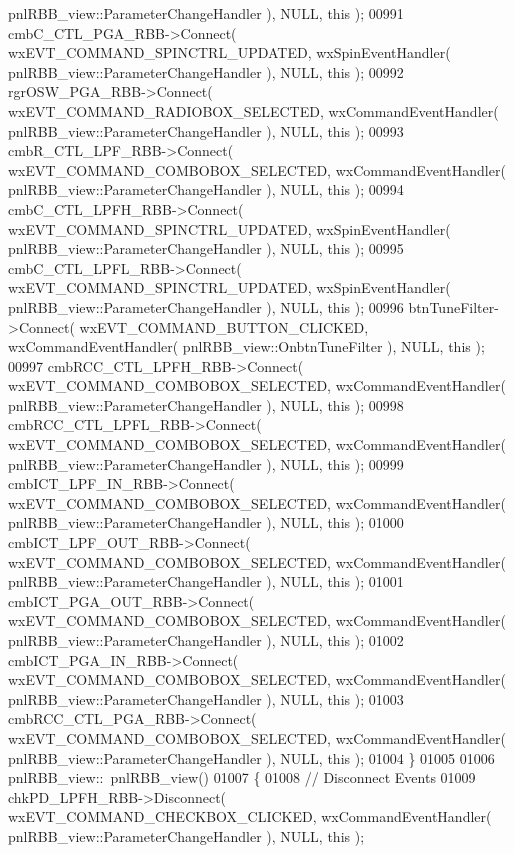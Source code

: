 \begin{DoxyCode}
      pnlRBB_view::ParameterChangeHandler ), NULL, \textcolor{keyword}{this} );
00991     cmbC_CTL_PGA_RBB->Connect( wxEVT\_COMMAND\_SPINCTRL\_UPDATED, wxSpinEventHandler( 
      pnlRBB_view::ParameterChangeHandler ), NULL, \textcolor{keyword}{this} );
00992     rgrOSW_PGA_RBB->Connect( wxEVT\_COMMAND\_RADIOBOX\_SELECTED, wxCommandEventHandler( 
      pnlRBB_view::ParameterChangeHandler ), NULL, \textcolor{keyword}{this} );
00993     cmbR_CTL_LPF_RBB->Connect( wxEVT\_COMMAND\_COMBOBOX\_SELECTED, wxCommandEventHandler( 
      pnlRBB_view::ParameterChangeHandler ), NULL, \textcolor{keyword}{this} );
00994     cmbC_CTL_LPFH_RBB->Connect( wxEVT\_COMMAND\_SPINCTRL\_UPDATED, wxSpinEventHandler( 
      pnlRBB_view::ParameterChangeHandler ), NULL, \textcolor{keyword}{this} );
00995     cmbC_CTL_LPFL_RBB->Connect( wxEVT\_COMMAND\_SPINCTRL\_UPDATED, wxSpinEventHandler( 
      pnlRBB_view::ParameterChangeHandler ), NULL, \textcolor{keyword}{this} );
00996     btnTuneFilter->Connect( wxEVT\_COMMAND\_BUTTON\_CLICKED, wxCommandEventHandler( 
      pnlRBB_view::OnbtnTuneFilter ), NULL, \textcolor{keyword}{this} );
00997     cmbRCC_CTL_LPFH_RBB->Connect( wxEVT\_COMMAND\_COMBOBOX\_SELECTED, wxCommandEventHandler( 
      pnlRBB_view::ParameterChangeHandler ), NULL, \textcolor{keyword}{this} );
00998     cmbRCC_CTL_LPFL_RBB->Connect( wxEVT\_COMMAND\_COMBOBOX\_SELECTED, wxCommandEventHandler( 
      pnlRBB_view::ParameterChangeHandler ), NULL, \textcolor{keyword}{this} );
00999     cmbICT_LPF_IN_RBB->Connect( wxEVT\_COMMAND\_COMBOBOX\_SELECTED, wxCommandEventHandler( 
      pnlRBB_view::ParameterChangeHandler ), NULL, \textcolor{keyword}{this} );
01000     cmbICT_LPF_OUT_RBB->Connect( wxEVT\_COMMAND\_COMBOBOX\_SELECTED, wxCommandEventHandler( 
      pnlRBB_view::ParameterChangeHandler ), NULL, \textcolor{keyword}{this} );
01001     cmbICT_PGA_OUT_RBB->Connect( wxEVT\_COMMAND\_COMBOBOX\_SELECTED, wxCommandEventHandler( 
      pnlRBB_view::ParameterChangeHandler ), NULL, \textcolor{keyword}{this} );
01002     cmbICT_PGA_IN_RBB->Connect( wxEVT\_COMMAND\_COMBOBOX\_SELECTED, wxCommandEventHandler( 
      pnlRBB_view::ParameterChangeHandler ), NULL, \textcolor{keyword}{this} );
01003     cmbRCC_CTL_PGA_RBB->Connect( wxEVT\_COMMAND\_COMBOBOX\_SELECTED, wxCommandEventHandler( 
      pnlRBB_view::ParameterChangeHandler ), NULL, \textcolor{keyword}{this} );
01004 \}
01005 
01006 pnlRBB_view::~pnlRBB_view()
01007 \{
01008     \textcolor{comment}{// Disconnect Events}
01009     chkPD_LPFH_RBB->Disconnect( wxEVT\_COMMAND\_CHECKBOX\_CLICKED, wxCommandEventHandler( 
      pnlRBB_view::ParameterChangeHandler ), NULL, \textcolor{keyword}{this} );

\end{DoxyCode}
